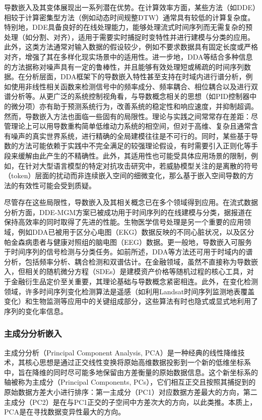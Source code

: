 导数嵌入及其变体展现出一系列潜在优势。在计算效率方面，某些方法（如DDE）相较于计算密集型方法（例如动态时间规整DTW）通常具有较低的计算复杂度。特别地，DDE具备良好的在线处理能力，能够处理流式时间序列而无需复杂的预处理（如分割、对齐），适用于需要实时捕捉时变特性并进行建模与分类的应用。此外，这类方法通常对输入数据的假设较少，例如不要求数据具有固定长度或严格对齐，增强了其在多样化现实场景中的适用性。进一步地，DDA等结合多种信息的方法据称对噪声具有一定的鲁棒性，并且能够有效处理短或稀疏的时间序列数据。在分析层面，DDA框架下的导数嵌入特性甚至支持在时域内进行谱分析，例如使用非线性相关函数来检测信号中的频率成分、频率耦合、相位耦合以及进行双谱分析等。从更广泛的系统控制视角看，与导数概念相关的思想（如PID控制器中的微分项）亦有助于预测系统行为，改善系统的稳定性和响应速度，并抑制超调。然而，导数嵌入方法也面临一些固有的局限性。理论与实践之间常常存在差距：尽管理论上可以用导数重构简单低维动力系统的相空间，但对于高维、复杂且通常含有噪声的真实世界系统，进行精确的全局建模往往是不可行的。同时，某些基于导数的方法可能依赖于实践中不完全满足的较强理论假设，有时需要引入正则化等手段来缓解由此产生的不精确性。此外，其适用性也可能受具体应用场景的限制，例如，在针对大型语言模型的特定对抗攻击研究中，若威胁模型关注的是离散的符号（token）层面的扰动而非连续嵌入空间的细微变化，那么基于嵌入空间导数的方法的有效性可能会受到质疑。

尽管存在这些局限性，导数嵌入及其相关概念已在多个领域得到应用。在流式数据分析方面，DDE-MGM方案已被成功用于时间序列的在线建模与分类，据报道在保持高效率的同时取得了先进的性能。生物医学信号处理是另一个重要的应用领域，例如DDA已被用于区分心电图（EKG）数据反映的不同心脏状况，以及区分帕金森病患者与健康对照组的脑电图（EEG）数据。更一般地，导数嵌入可服务于时间序列的信号检测与分类任务。如前所述，DDA等方法还可用于时域内的谱分析，包括频率分析、耦合检测和双谱估计。在金融领域，虽然不直接称为导数嵌入，但相关的随机微分方程（SDEs）是建模资产价格等随机过程的核心工具，对于金融衍生品定价至关重要，其理论基础与导数概念紧密相连。此外，在变化检测领域，许多时间序列变化检测算法是遥感（如利用Landsat时间序列监测地表覆盖变化）和生物监测等应用中的关键组成部分，这些算法有时也隐式或显式地利用了序列的变化率信息。
 
\subsubsection{主成分分析嵌入}
主成分分析（Principal Component Analysis, PCA）是一种经典的线性降维技术，其核心思想是通过正交线性变换将原始高维数据投影到一个新的低维坐标系中，旨在降维的同时尽可能多地保留由方差衡量的原始数据信息。这个新坐标系的轴被称为主成分（Principal Components, PCs），它们相互正交且按照其捕捉到的原始数据方差大小进行排序：第一主成分（PC1）对应数据方差最大的方向，第二主成分（PC2）是在与PC1正交的子空间中方差次大的方向，以此类推。本质上，PCA是在寻找数据变异性最大的方向。

